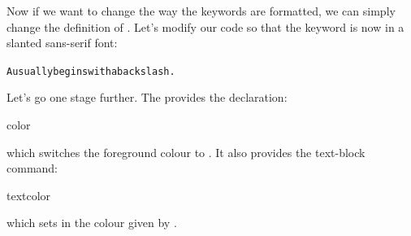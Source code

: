 Now if we want to change the way the keywords are formatted,
we can simply change the definition of .
Let's modify our code so that the keyword is now in a 
slanted sans-serif font:
\begin{code}
\begin{alltt}



A  usually begins with a backslash.

\end{alltt}
\end{code}%
Let's go one stage further.  The  
 provides the \gls{declaration}:
\begin{definition}
\gls{color}
\end{definition}
which switches the foreground colour to . It also
provides the text-block command:
\begin{definition}
\gls{textcolor}
\end{definition}
which sets  in the colour given by .


